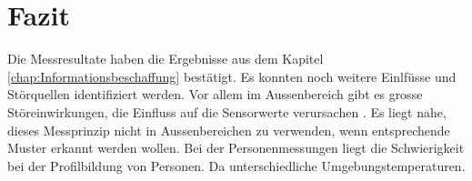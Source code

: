 \section{Fazit}
Die Messresultate haben die Ergebnisse aus dem Kapitel \ref{chap:Informationsbeschaffung} bestätigt. Es konnten noch weitere Einlfüsse und Störquellen identifiziert werden. Vor allem im Aussenbereich gibt es grosse Störeinwirkungen, die Einfluss auf die Sensorwerte verursachen . Es liegt nahe, dieses Messprinzip nicht in Aussenbereichen zu verwenden, wenn entsprechende Muster erkannt werden wollen.
 Bei der Personenmessungen liegt die Schwierigkeit bei der Profilbildung von Personen. Da unterschiedliche Umgebungstemperaturen.

